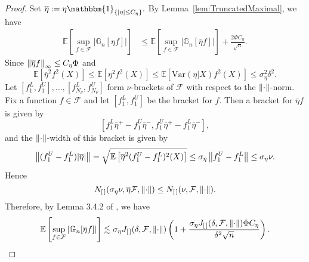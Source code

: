 \begin{proof}
Set
$\overline{\eta} := \eta\mathbbm{1}_{\{|\eta| \le C_{\eta}\}}.$
By Lemma~\ref{lem:TruncatedMaximal}, we have
\begin{align*}
\mathbb{E}\left[\sup_{f\in\mathcal{F}}\left|\mathbb{G}_n\left[\eta f\right]\right|\right] &\le \mathbb{E}\left[\sup_{f\in\mathcal{F}}\left|\mathbb{G}_n\left[\overline{\eta} f\right]\right|\right] + \frac{2\Phi C_{\eta}}{\sqrt{n}}.
\end{align*}
Since $\left\lVert\overline{\eta} f\right\rVert_{\infty} \le C_{\eta}\Phi$ and
\[
\mathbb{E}\left[\overline{\eta}^2f^2(X)\right] \le \mathbb{E}\left[\eta^2 f^2(X)\right] \le \mathbb{E}\left[\mbox{Var}(\eta|X)f^2(X)\right] \le \sigma_{\eta}^2\delta^2.
\]
Let $[f_1^L, f_1^U], \ldots, [f_{N_{\nu}}^L, f_{N_{\nu}}^U]$ form $\nu$-brackets of $\mathcal{F}$ with respect to the $\left\lVert\cdot\right\rVert$-norm. Fix a function $f\in\mathcal{F}$ and let $[f_1^L, f_1^U]$ be the bracket for $f$. Then a bracket for $\overline{\eta}f$ is given by
\[
\left[f_1^L\overline{\eta}^+ - f_1^U\overline{\eta}^-, f_1^U\overline{\eta}^+ - f_1^L\overline{\eta}^-\right],
\]
and the $\left\lVert\cdot\right\rVert$-width of this bracket is given by
\[
\left\lVert(f_1^U - f_1^L)|\overline{\eta}|\right\rVert = \sqrt{\mathbb{E}\left[\overline{\eta}^2(f_1^U - f_1^L)^2(X)\right]} \le \sigma_{\eta}\left\lVert f_1^U - f_1^L\right\rVert \le \sigma_{\eta}\nu.
\]
Hence
\[
N_{[\,]}(\sigma_{\eta}\nu, \overline{\eta}\mathcal{F}, \left\lVert\cdot\right\rVert) \le N_{[\,]}(\nu, \mathcal{F}, \left\lVert\cdot\right\rVert).
\]
Therefore, by Lemma 3.4.2 of \cite{VdVW96}, we have
\[
\mathbb{E}\left[\sup_{f\in\mathcal{F}}|\mathbb{G}_n[\overline{\eta}f]|\right] \lesssim \sigma_{\eta}J_{[\,]}(\delta, \mathcal{F}, \left\lVert\cdot\right\rVert)\left(1 + \frac{\sigma_{\eta}J_{[\,]}(\delta, \mathcal{F}, \left\lVert\cdot\right\rVert)\Phi C_{\eta}}{\delta^2\sqrt{n}}\right).\qedhere
\]
\end{proof}

